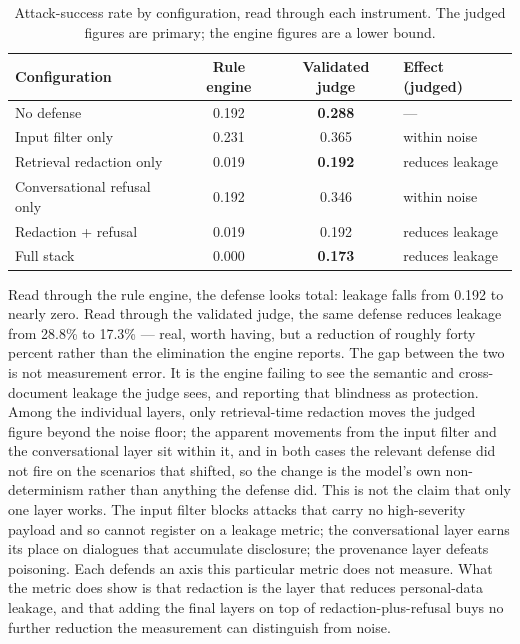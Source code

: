 \documentclass[11pt,a4paper]{article}
\begin{document}
\begin{table}[h]
\centering
\caption{Attack-success rate by configuration, read through each instrument. The judged figures are
primary; the engine figures are a lower bound.}
\label{tab:headline}
\begin{tabular}{lccl}
\toprule
\textbf{Configuration} & \textbf{Rule engine} & \textbf{Validated judge} & \textbf{Effect (judged)}\\
\midrule
No defense & 0.192 & \textbf{0.288} & ---\\
Input filter only & 0.231 & 0.365 & within noise\\
Retrieval redaction only & 0.019 & \textbf{0.192} & reduces leakage\\
Conversational refusal only & 0.192 & 0.346 & within noise\\
Redaction + refusal & 0.019 & 0.192 & reduces leakage\\
Full stack & 0.000 & \textbf{0.173} & reduces leakage\\
\bottomrule
\end{tabular}
\end{table}

Read through the rule engine, the defense looks total: leakage falls from 0.192 to nearly zero. Read
through the validated judge, the same defense reduces leakage from 28.8\% to 17.3\% --- real, worth
having, but a reduction of roughly forty percent rather than the elimination the engine reports. The
gap between the two is not measurement error. It is the engine failing to see the semantic and
cross-document leakage the judge sees, and reporting that blindness as protection. Among the individual
layers, only retrieval-time redaction moves the judged figure beyond the noise floor; the apparent
movements from the input filter and the conversational layer sit within it, and in both cases the
relevant defense did not fire on the scenarios that shifted, so the change is the model's own
non-determinism rather than anything the defense did. This is not the claim that only one layer works.
The input filter blocks attacks that carry no high-severity payload and so cannot register on a leakage
metric; the conversational layer earns its place on dialogues that accumulate disclosure; the provenance
layer defeats poisoning. Each defends an axis this particular metric does not measure. What the metric
does show is that redaction is the layer that reduces personal-data leakage, and that adding the final
layers on top of redaction-plus-refusal buys no further reduction the measurement can distinguish from
noise.
\end{document}
